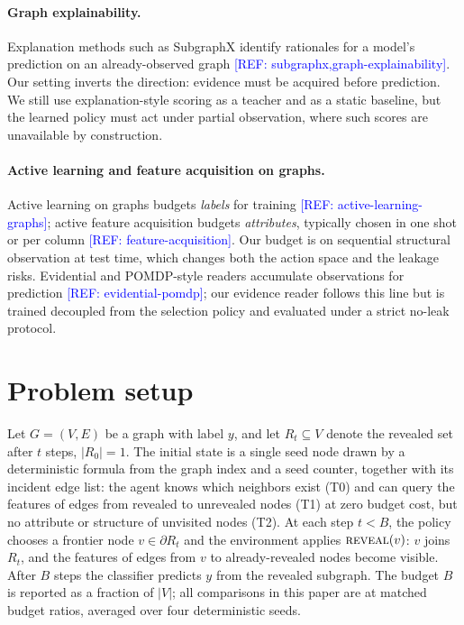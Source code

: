 \documentclass{article}
\newcommand{\refadd}[1]{\textcolor{blue}{[REF: #1]}}
\newcommand{\reveal}{\textsc{reveal}}
\begin{document}
\paragraph{Graph explainability.}
Explanation methods such as SubgraphX identify rationales for a model's prediction on an already-observed graph \refadd{subgraphx,graph-explainability}. Our setting inverts the direction: evidence must be acquired before prediction. We still use explanation-style scoring as a teacher and as a static baseline, but the learned policy must act under partial observation, where such scores are unavailable by construction.

\paragraph{Active learning and feature acquisition on graphs.}
Active learning on graphs budgets \emph{labels} for training \refadd{active-learning-graphs}; active feature acquisition budgets \emph{attributes}, typically chosen in one shot or per column \refadd{feature-acquisition}. Our budget is on sequential structural observation at test time, which changes both the action space and the leakage risks. Evidential and POMDP-style readers accumulate observations for prediction \refadd{evidential-pomdp}; our evidence reader follows this line but is trained decoupled from the selection policy and evaluated under a strict no-leak protocol.

\section{Problem setup}
\label{sec:setup}

Let $G=(V,E)$ be a graph with label $y$, and let $R_t \subseteq V$ denote the revealed set after $t$ steps, $|R_0|=1$. The initial state is a single seed node drawn by a deterministic formula from the graph index and a seed counter, together with its incident edge list: the agent knows which neighbors exist (T0) and can query the features of edges from revealed to unrevealed nodes (T1) at zero budget cost, but no attribute or structure of unvisited nodes (T2). At each step $t<B$, the policy chooses a frontier node $v \in \partial R_t$ and the environment applies $\reveal(v)$: $v$ joins $R_t$, and the features of edges from $v$ to already-revealed nodes become visible. After $B$ steps the classifier predicts $y$ from the revealed subgraph. The budget $B$ is reported as a fraction of $|V|$; all comparisons in this paper are at matched budget ratios, averaged over four deterministic seeds.
\end{document}
